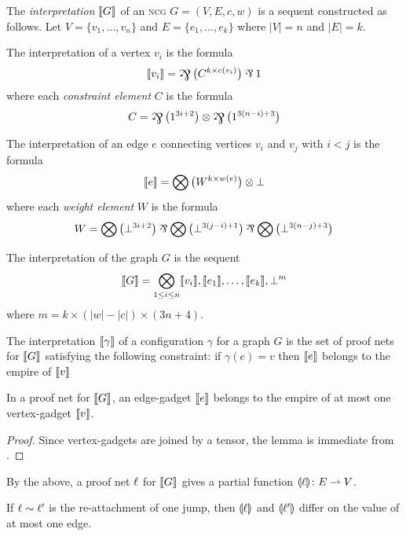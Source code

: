 \begin{definition}
The \emph{interpretation} $\llbracket G\rrbracket$ of an \textsc{ncg} $G=(V,E,c,w)$ is a sequent constructed as follows.
%
Let $V=\{v_1,\dotsc,v_n\}$ and $E=\{e_1,\dotsc,e_k\}$ where $|V|=n$ and $|E|=k$.

The interpretation of a vertex $v_i$ is the formula
\[
	\itn{v_i} = \bigparr\big(C^{k\times c(v_i)} \big)\parr 1
\]
where each \emph{constraint element} $C$ is the formula
\[
	C = \bigparr\big(1^{3i+2}\big) \tn \bigparr\big(1^{3(n-i)+3}\big)
\]

The interpretation of an edge $e$ connecting vertices $v_i$ and $v_j$ with $i<j$ is the formula
\[
	\llbracket e\rrbracket = \bigotimes\big(W^{k\times w(e)}\big)\otimes\bot
\]
where each \emph{weight element} $W$ is the formula
\[
	W = \bigotimes\big(\bot^{3i+2}\big)\parr\bigotimes\big(\bot^{3(j-i)+1}\big)\parr\bigotimes\big(\bot^{3(n-j)+3}\big)
\]


The interpretation of the graph $G$ is the sequent
\[
	\llbracket G\rrbracket = \bigotimes_{1\leq i\leq n}\llbracket v_i\rrbracket, \llbracket e_1\rrbracket,\dotsc,\llbracket e_k\rrbracket, \bot^m
\]
where $m=k\times(|w|-|c|)\times(3n+4)$.

\end{definition}



\begin{definition}
The interpretation $\llbracket\gamma\rrbracket$ of a configuration $\gamma$ for a graph $G$ is the set of proof nets for $\llbracket G\rrbracket$ satisfying the following constraint: if $\gamma(e)=v$ then $\llbracket e\rrbracket$ belongs to the empire of $\llbracket v\rrbracket$
\end{definition}


\begin{lemma}
In a proof net for $\llbracket G\rrbracket$, an edge-gadget $\llbracket e\rrbracket$ belongs to the empire of at most one vertex-gadget $\llbracket v\rrbracket$.
\end{lemma}

\begin{proof}
Since vertex-gadgets are joined by a tensor, the lemma is immediate from \cite[Proposition 1]{Bellin-vandeWiele-1995}.
\end{proof}


By the above, a proof net $\ell$ for $\llbracket G\rrbracket$ gives a partial function $\llparenthesis\ell\rrparenthesis\colon E\rightharpoonup V$.


\begin{lemma}
If $\ell\sim\ell'$ is the re-attachment of one jump, then $\llparenthesis\ell\rrparenthesis$ and $\llparenthesis\ell'\rrparenthesis$ differ on the value of at most one edge.
\end{lemma}

